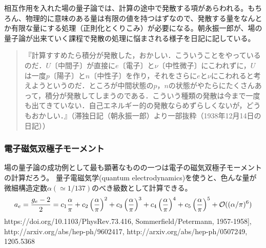 \documentclass[10pt,a4paper]{jarticle}
\begin{document}
相互作用を入れた場の量子論では、計算の途中で発散する項があらわれる。もちろん、物理的に意味のある量は有限の値を持つはずなので、発散する量をなんとか有限な量にする処理（正則化とくりこみ）が必要になる。朝永振一郎が、場の量子論が出来ていく課程で発散の処理に悩まされる様子を日記に記している。
\begin{quote}
『計算すすめたら積分が発散した，おかしい．こういうことをやっているのだ．$U$〔中間子〕が直接に$e$〔電子〕と$\nu$〔中性微子〕にこわれずに，$U$は一度$p$〔陽子〕と$n$〔中性子〕を作り，それをさらに$e$と$\nu$にこわれると考えようというのだ．ところが中間状態の$p$，$n$の状態がやたらにたくさんあって，積分が発散してしまうのである．こういう種類の発散は今まで一度も出てきていない．自己エネルギー的の発散ならめずらしくないが，どうもおかしい．』（滞独日記（朝永振一郎）より一部抜粋（1938年12月14日の日記））
\end{quote}



\subsubsection*{電子磁気双極子モーメント}
場の量子論の成功例として最も顕著なものの一つは電子の磁気双極子モーメントの計算だろう。
量子電磁気学(quantum electrodynamics)を使うと、色んな量が微細構造定数$\alpha (\simeq 1/137)$のべき級数として計算できる。
\begin{align}
a_e = \frac{g_e-2}{2} =
c_1 \frac{\alpha}{\pi} +
c_2 \left(\frac{\alpha}{\pi}\right)^2 +  
c_3 \left(\frac{\alpha}{\pi}\right)^3 +  
c_4 \left(\frac{\alpha}{\pi}\right)^4 +  
c_5 \left(\frac{\alpha}{\pi}\right)^5 + {\cal O}((\alpha/\pi)^6)
\end{align}
https://doi.org/10.1103/PhysRev.73.416,
Sommerfield/Petermann, 1957-1958],
http://arxiv.org/abs/hep-ph/9602417,
http://arxiv.org/abs/hep-ph/0507249,
1205.5368
\end{document}
